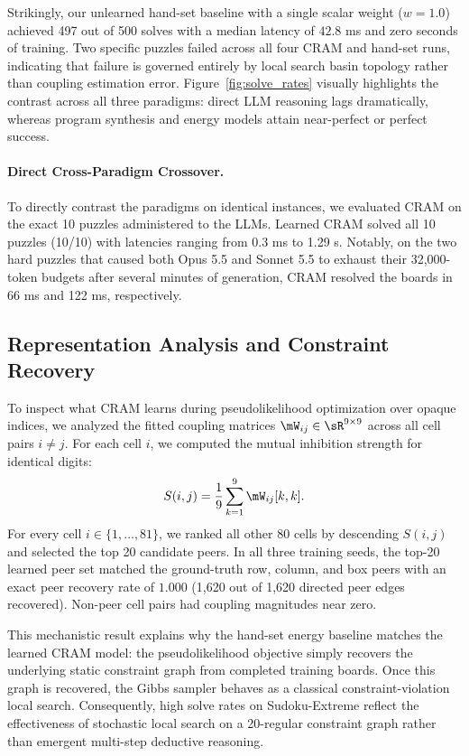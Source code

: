 \documentclass{article} %
\begin{document}
Strikingly, our unlearned hand-set baseline with a single scalar weight ($w=1.0$) achieved 497 out of 500 solves with a median latency of $42.8$ ms and zero seconds of training. Two specific puzzles failed across all four CRAM and hand-set runs, indicating that failure is governed entirely by local search basin topology rather than coupling estimation error. Figure~\ref{fig:solve_rates} visually highlights the contrast across all three paradigms: direct LLM reasoning lags dramatically, whereas program synthesis and energy models attain near-perfect or perfect success.

\paragraph{Direct Cross-Paradigm Crossover.}
To directly contrast the paradigms on identical instances, we evaluated CRAM on the exact 10 puzzles administered to the LLMs. Learned CRAM solved all 10 puzzles (10/10) with latencies ranging from 0.3 ms to 1.29 s. Notably, on the two hard puzzles that caused both Opus 5.5 and Sonnet 5.5 to exhaust their 32,000-token budgets after several minutes of generation, CRAM resolved the boards in 66 ms and 122 ms, respectively.

\subsection{Representation Analysis and Constraint Recovery}
\label{sec:exp_representation}
To inspect what CRAM learns during pseudolikelihood optimization over opaque indices, we analyzed the fitted coupling matrices $\mW_{ij} \in \sR^{9 \times 9}$ across all cell pairs $i \neq j$. For each cell $i$, we computed the mutual inhibition strength for identical digits:
\begin{equation}
S(i, j) = \frac{1}{9} \sum_{k=1}^9 \mW_{ij}[k, k].
\end{equation}
For every cell $i \in \{1, \dots, 81\}$, we ranked all other 80 cells by descending $S(i, j)$ and selected the top 20 candidate peers. In all three training seeds, the top-20 learned peer set matched the ground-truth row, column, and box peers with an exact peer recovery rate of $1.000$ (1,620 out of 1,620 directed peer edges recovered). Non-peer cell pairs had coupling magnitudes near zero.

This mechanistic result explains why the hand-set energy baseline matches the learned CRAM model: the pseudolikelihood objective simply recovers the underlying static constraint graph from completed training boards. Once this graph is recovered, the Gibbs sampler behaves as a classical constraint-violation local search. Consequently, high solve rates on Sudoku-Extreme reflect the effectiveness of stochastic local search on a 20-regular constraint graph rather than emergent multi-step deductive reasoning.
\end{document}
